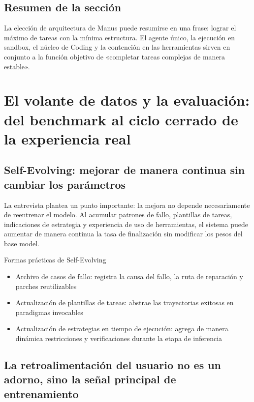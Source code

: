 \documentclass[a4paper]{article}
\begin{document}
\subsection{Resumen de la sección}

La elección de arquitectura de Manus puede resumirse en una frase: lograr el máximo de tareas con la mínima estructura. El agente único, la ejecución en sandbox, el núcleo de Coding y la contención en las herramientas sirven en conjunto a la función objetivo de «completar tareas complejas de manera estable».

\section{El volante de datos y la evaluación: del benchmark al ciclo cerrado de la experiencia real}

\subsection{Self-Evolving: mejorar de manera continua sin cambiar los parámetros}

La entrevista plantea un punto importante: la mejora no depende necesariamente de reentrenar el modelo. Al acumular patrones de fallo, plantillas de tareas, indicaciones de estrategia y experiencia de uso de herramientas, el sistema puede aumentar de manera continua la tasa de finalización sin modificar los pesos del base model.

\begin{knowledgebox}{Formas prácticas de Self-Evolving}
\begin{itemize}
    \item Archivo de casos de fallo: registra la causa del fallo, la ruta de reparación y parches reutilizables
    \item Actualización de plantillas de tareas: abstrae las trayectorias exitosas en paradigmas invocables
    \item Actualización de estrategias en tiempo de ejecución: agrega de manera dinámica restricciones y verificaciones durante la etapa de inferencia
\end{itemize}
\end{knowledgebox}

\subsection{La retroalimentación del usuario no es un adorno, sino la señal principal de entrenamiento}
\end{document}
